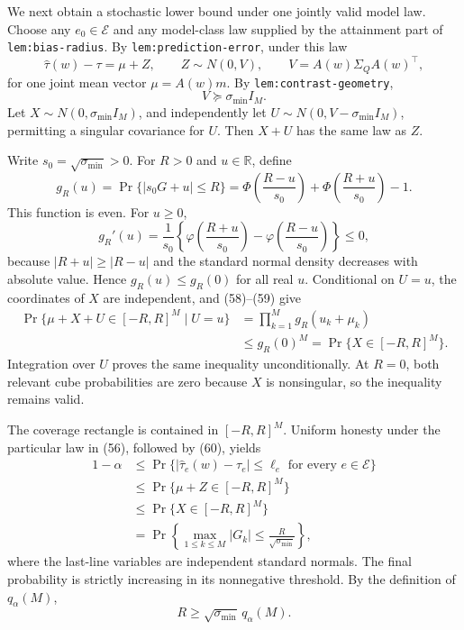 We next obtain a stochastic lower bound under one jointly valid model law.
Choose any \(e_0\in\mathcal E\) and any model-class law supplied by the
attainment part of \texttt{lem:bias-radius}.  By
\texttt{lem:prediction-error}, under this law
\[
 \widehat\tau(w)-\tau=\mu+Z,
 \qquad Z\sim N(0,V),
 \qquad V=A(w)\Sigma_QA(w)^{\top}, \tag{56}
\]
for one joint mean vector \(\mu=A(w)m\).  By
\texttt{lem:contrast-geometry},
\[
 V\succeq\sigma_{\min}I_M. \tag{57}
\]
Let \(X\sim N(0,\sigma_{\min}I_M)\), and independently let
\(U\sim N(0,V-\sigma_{\min}I_M)\), permitting a singular covariance for
\(U\).  Then \(X+U\) has the same law as \(Z\).

Write \(s_0=\sqrt{\sigma_{\min}}>0\).  For \(R>0\) and \(u\in\mathbb R\),
define
\[
 g_R(u)=\Pr\{|s_0G+u|\leq R\}
 =\Phi\!\left(\frac{R-u}{s_0}\right)
  +\Phi\!\left(\frac{R+u}{s_0}\right)-1. \tag{58}
\]
This function is even.  For \(u\geq0\),
\[
 g_R'(u)=\frac1{s_0}\left\{
 \varphi\!\left(\frac{R+u}{s_0}\right)
 -\varphi\!\left(\frac{R-u}{s_0}\right)\right\}\leq0, \tag{59}
\]
because \(|R+u|\geq|R-u|\) and the standard normal density decreases with
absolute value.  Hence \(g_R(u)\leq g_R(0)\) for all real \(u\).  Conditional
on \(U=u\), the coordinates of \(X\) are independent, and (58)--(59) give
\[
\begin{aligned}
 \Pr\{\mu+X+U\in[-R,R]^M\mid U=u\}
 &=\prod_{k=1}^M g_R(u_k+\mu_k)\\
 &\leq g_R(0)^M
 =\Pr\{X\in[-R,R]^M\}.
\end{aligned} \tag{60}
\]
Integration over \(U\) proves the same inequality unconditionally.  At
\(R=0\), both relevant cube probabilities are zero because \(X\) is
nonsingular, so the inequality remains valid.

The coverage rectangle is contained in \([-R,R]^M\).  Uniform honesty under
the particular law in (56), followed by (60), yields
\[
\begin{aligned}
 1-\alpha
 &\leq\Pr\{|\widehat\tau_e(w)-\tau_e|\leq\ell_e
              \text{ for every }e\in\mathcal E\}\\
 &\leq\Pr\{\mu+Z\in[-R,R]^M\}\\
 &\leq\Pr\{X\in[-R,R]^M\}\\
 &=\Pr\left\{\max_{1\leq k\leq M}|G_k|
       \leq\frac{R}{\sqrt{\sigma_{\min}}}\right\},
\end{aligned} \tag{61}
\]
where the last-line variables are independent standard normals.  The final
probability is strictly increasing in its nonnegative threshold.  By the
definition of \(q_\alpha(M)\),
\[
 R\geq\sqrt{\sigma_{\min}}\,q_\alpha(M). \tag{62}
\]

